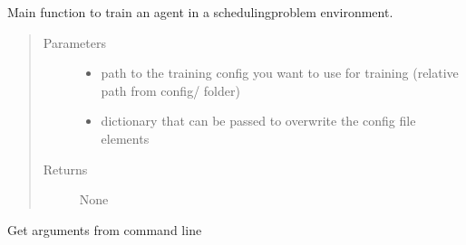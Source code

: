 \documentclass[letterpaper,10pt,english]{sphinxmanual}
\begin{document}

\begin{fulllineitems}
\label{\detokenize{agents.reinforcement_learning:agents.train.main}}
\sphinxAtStartPar
Main function to train an agent in a scheduling\sphinxhyphen{}problem environment.
\begin{quote}\begin{description}
\item[{Parameters}] \leavevmode\begin{itemize}
\item {} 
\sphinxAtStartPar
{} \textendash{} path to the training config you want to use for training
(relative path from config/ folder)

\item {} 
\sphinxAtStartPar
{} \textendash{} dictionary that can be passed to overwrite the config file elements

\end{itemize}

\item[{Returns}] \leavevmode
\sphinxAtStartPar
None

\end{description}\end{quote}

\end{fulllineitems}


\begin{fulllineitems}
\label{\detokenize{agents.reinforcement_learning:agents.train.get_perser_args}}
\sphinxAtStartPar
Get arguments from command line

\end{fulllineitems}
\end{document}
